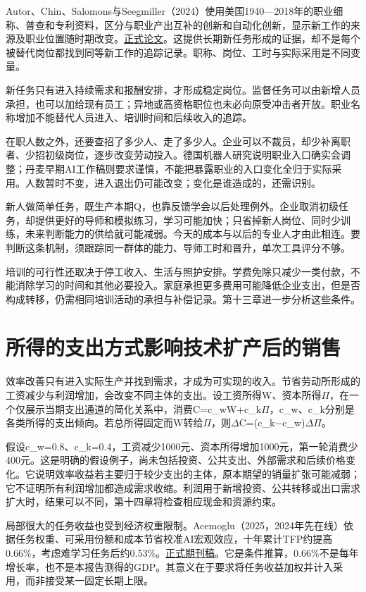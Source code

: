 \documentclass[UTF8,fontset=windows,12pt,a4paper,oneside,openany]{ctexbook}
\begin{document}
Autor、Chin、Salomons与Seegmiller（2024）使用美国1940—2018年的职业细称、普查和专利资料，区分与职业产出互补的创新和自动化创新，显示新工作的来源及职业位置随时期改变。\href{https://doi.org/10.1093/qje/qjae008}{正式论文}。这提供长期新任务形成的证据，却不是每个被替代岗位都找到同等新工作的追踪记录。职称、岗位、工时与实际采用是不同变量。

新任务只有进入持续需求和报酬安排，才形成稳定岗位。监督任务可以由新增人员承担，也可以加给现有员工；异地或高资格职位也未必向原受冲击者开放。职业名称增加不能替代人员进入、培训时间和后续收入的追踪。

在职人数之外，还要查招了多少人、走了多少人。企业可以不裁员，却少补离职者、少招初级岗位，逐步改变劳动投入。德国机器人研究说明职业入口确实会调整；丹麦早期AI工作稿则要求谨慎，不能把暴露职业的入口变化全归于实际采用。人数暂时不变，进入退出仍可能改变；变化是谁造成的，还需识别。

新人做简单任务，既生产本期Q，也靠反馈学会以后处理例外。企业取消初级任务，却提供更好的导师和模拟练习，学习可能加快；只省掉新人岗位、同时少训练，未来判断能力的供给就可能减弱。今天的成本与以后的专业人才由此相连。要判断这条机制，须跟踪同一群体的能力、导师工时和晋升，单次工具评分不够。

培训的可行性还取决于停工收入、生活与照护安排。学费免除只减少一类付款，不能消除学习的时间和其他必要投入。家庭承担更多费用可能降低企业支出，但是否构成转移，仍需相同培训活动的承担与补偿记录。第十三章进一步分析这些条件。

\section{所得的支出方式影响技术扩产后的销售}

效率改善只有进入实际生产并找到需求，才成为可实现的收入。节省劳动所形成的工资减少与利润增加，会改变不同主体的支出。设工资所得W、资本所得\ensuremath{\Pi}，在一个仅展示当期支出通道的简化关系中，消费C=c\_wW+c\_k\ensuremath{\Pi}，c\_w、c\_k分别是各类所得的支出倾向。若总所得固定而W转给\ensuremath{\Pi}，则\ensuremath{\Delta}C=(c\_k\ensuremath{-}c\_w)\ensuremath{\Delta}\ensuremath{\Pi}。

假设c\_w=0.8、c\_k=0.4，工资减少1000元、资本所得增加1000元，第一轮消费少400元。这是明确的假设例子，尚未包括投资、公共支出、外部需求和后续价格变化。它说明效率收益若主要归于较少支出的主体，原本期望的销量扩张可能减弱；它不证明所有利润增加都造成需求收缩。利润用于新增投资、公共转移或出口需求扩大时，结果可以不同，第十四章将检查相应现金和资源约束。

局部很大的任务收益也受到经济权重限制。Acemoglu（2025，2024年先在线）依据任务权重、可采用份额和成本节省校准AI宏观效应，十年累计TFP约提高0.66\%，考虑难学习任务后约0.53\%。\href{https://doi.org/10.1093/epolic/eiae042}{正式期刊稿}。它是条件推算，0.66\%不是每年增长率，也不是本报告测得的GDP。其意义在于要求将任务收益加权并计入采用，而非接受某一固定长期上限。
\end{document}
